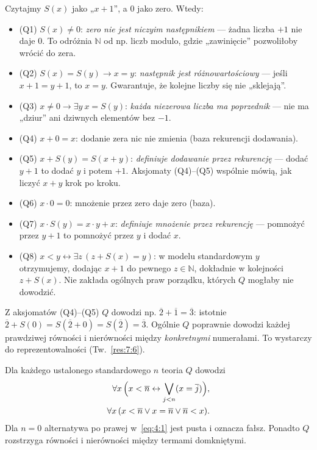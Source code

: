 \begin{uwaga}\label{res:4:2}
Czytajmy $S(x)$ jako „$x+1$”, a $0$ jako zero. Wtedy:
\begin{itemize}
\item \textup{(Q1)} $S(x)\ne0$: \emph{zero nie jest niczyim następnikiem} --- żadna liczba $+1$ nie daje $0$. To odróżnia $\mathbb N$ od np. liczb modulo, gdzie „zawinięcie” pozwoliłoby wrócić do zera.
\item \textup{(Q2)} $S(x)=S(y)\to x=y$: \emph{następnik jest różnowartościowy} --- jeśli $x+1=y+1$, to $x=y$. Gwarantuje, że kolejne liczby się nie „sklejają”.
\item \textup{(Q3)} $x\ne0\to\exists y\ x=S(y)$: \emph{każda niezerowa liczba ma poprzednik} --- nie ma „dziur” ani dziwnych elementów bez $-1$.
\item \textup{(Q4)} $x+0=x$: dodanie zera nic nie zmienia (baza rekurencji dodawania).
\item \textup{(Q5)} $x+S(y)=S(x+y)$: \emph{definiuje dodawanie przez rekurencję} --- dodać $y+1$ to dodać $y$ i potem $+1$. Aksjomaty (Q4)--(Q5) wspólnie mówią, jak liczyć $x+y$ krok po kroku.
\item \textup{(Q6)} $x\cdot0=0$: mnożenie przez zero daje zero (baza).
\item \textup{(Q7)} $x\cdot S(y)=x\cdot y+x$: \emph{definiuje mnożenie przez rekurencję} --- pomnożyć przez $y+1$ to pomnożyć przez $y$ i dodać $x$.
\item \textup{(Q8)} $x<y\leftrightarrow\exists z\,(z+S(x)=y)$: w modelu standardowym $y$ otrzymujemy, dodając $x+1$ do pewnego $z\in\mathbb N$, dokładnie w kolejności $z+S(x)$. Nie zakłada ogólnych praw porządku, których $Q$ mogłaby nie dowodzić.
\end{itemize}
\end{uwaga}

\begin{przyklad}\label{res:4:3}
Z aksjomatów (Q4)--(Q5) $Q$ dowodzi np. $\overline2+\overline1=\overline3$: istotnie $\overline2+S(0)=S(\overline2+0)=S(\overline2)=\overline3$. Ogólnie $Q$ poprawnie dowodzi każdej prawdziwej równości i nierówności między \emph{konkretnymi} numerałami. To wystarczy do reprezentowalności (Tw.~\ref{res:7:6}).
\end{przyklad}

\begin{lemat}\label{res:4:4}
Dla każdego ustalonego standardowego $n$ teoria $Q$ dowodzi
\begin{align}
\forall x\,\Bigl(x<\overline n\leftrightarrow\bigvee_{j<n}(x=\overline j)\Bigr),\label{eq:4:1}\\
\forall x\,(x<\overline n\lor x=\overline n\lor\overline n<x).\label{eq:4:2}
\end{align}
Dla $n=0$ alternatywa po prawej w~\eqref{eq:4:1} jest pusta i oznacza fałsz. Ponadto $Q$ rozstrzyga równości i nierówności między termami domkniętymi.
\end{lemat}

